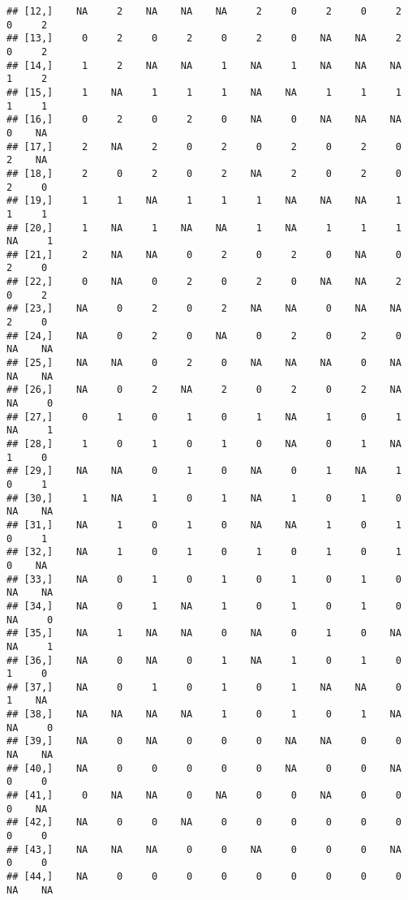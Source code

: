 \documentclass[
]{article}
\begin{document}
\begin{verbatim}
## [12,]    NA     2    NA    NA    NA     2     0     2     0     2     0     2
## [13,]     0     2     0     2     0     2     0    NA    NA     2     0     2
## [14,]     1     2    NA    NA     1    NA     1    NA    NA    NA     1     2
## [15,]     1    NA     1     1     1    NA    NA     1     1     1     1     1
## [16,]     0     2     0     2     0    NA     0    NA    NA    NA     0    NA
## [17,]     2    NA     2     0     2     0     2     0     2     0     2    NA
## [18,]     2     0     2     0     2    NA     2     0     2     0     2     0
## [19,]     1     1    NA     1     1     1    NA    NA    NA     1     1     1
## [20,]     1    NA     1    NA    NA     1    NA     1     1     1    NA     1
## [21,]     2    NA    NA     0     2     0     2     0    NA     0     2     0
## [22,]     0    NA     0     2     0     2     0    NA    NA     2     0     2
## [23,]    NA     0     2     0     2    NA    NA     0    NA    NA     2     0
## [24,]    NA     0     2     0    NA     0     2     0     2     0    NA    NA
## [25,]    NA    NA     0     2     0    NA    NA    NA     0    NA    NA    NA
## [26,]    NA     0     2    NA     2     0     2     0     2    NA    NA     0
## [27,]     0     1     0     1     0     1    NA     1     0     1    NA     1
## [28,]     1     0     1     0     1     0    NA     0     1    NA     1     0
## [29,]    NA    NA     0     1     0    NA     0     1    NA     1     0     1
## [30,]     1    NA     1     0     1    NA     1     0     1     0    NA    NA
## [31,]    NA     1     0     1     0    NA    NA     1     0     1     0     1
## [32,]    NA     1     0     1     0     1     0     1     0     1     0    NA
## [33,]    NA     0     1     0     1     0     1     0     1     0    NA    NA
## [34,]    NA     0     1    NA     1     0     1     0     1     0    NA     0
## [35,]    NA     1    NA    NA     0    NA     0     1     0    NA    NA     1
## [36,]    NA     0    NA     0     1    NA     1     0     1     0     1     0
## [37,]    NA     0     1     0     1     0     1    NA    NA     0     1    NA
## [38,]    NA    NA    NA    NA     1     0     1     0     1    NA    NA     0
## [39,]    NA     0    NA     0     0     0    NA    NA     0     0    NA    NA
## [40,]    NA     0     0     0     0     0    NA     0     0    NA     0     0
## [41,]     0    NA    NA     0    NA     0     0    NA     0     0     0    NA
## [42,]    NA     0     0    NA     0     0     0     0     0     0     0     0
## [43,]    NA    NA    NA     0     0    NA     0     0     0    NA     0     0
## [44,]    NA     0     0     0     0     0     0     0     0     0    NA    NA

\end{verbatim}
\end{document}
